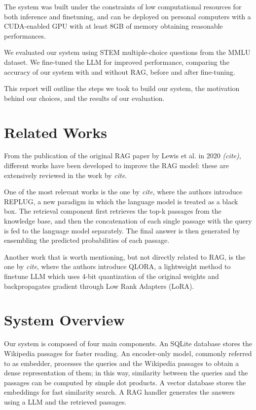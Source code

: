 \documentclass[11pt]{article}
\begin{document}
The system was built under the constraints of low computational resources for 
both inference and finetuning, and can be deployed on personal computers with a
CUDA-enabled GPU with at least 8GB of memory obtaining reasonable performances.

We evaluated our system using STEM multiple-choice questions from the MMLU
dataset. We fine-tuned the LLM for improved performance, comparing the accuracy
of our system with and without RAG, before and after fine-tuning.

This report will outline the steps we took to build our system, the motivation
behind our choices, and the results of our evaluation. 

\section{Related Works}

From the publication of the original RAG paper by Lewis et al. in 2020 \textit{(cite)},
different works have been developed to improve the RAG model: these are extensively
reviewed in the work by \textit{cite}.

One of the most relevant works is the one by \textit{cite}, where the authors
introduce REPLUG, a new paradigm in which the language model is treated as a
black box. The retrieval component first retrieves the top-k passages from the
knowledge base, and then the concatenation of each single passage with the
query is fed to the language model separately. The final answer is then generated
by ensembling the predicted probabilities of each passage.

Another work that is worth mentioning, but not directly related to RAG, is the
one by \textit{cite}, where the authors introduce QLORA, a lightweight method 
to finetune LLM which uses 4-bit quantization of the original weights and backpropagates   
gradient through Low Rank Adapters (LoRA).

\section{System Overview}
Our system is composed of four main components.
An SQLite database stores the Wikipedia passages for faster reading.
An encoder-only model, commonly referred to as embedder, processes the queries and the 
Wikipedia passages to obtain a dense representation of them; in this way, similarity 
between the queries and the passages can be computed by simple dot products.
A vector database stores the embeddings for fast similarity search.
A RAG handler generates the answers using a LLM and the retrieved passages.
\end{document}
